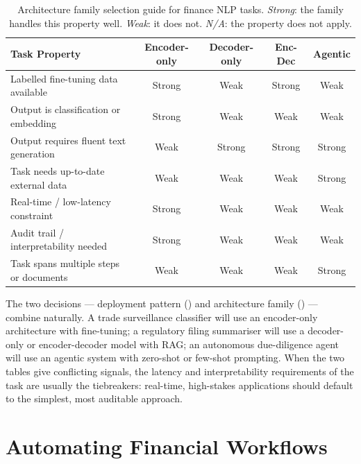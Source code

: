 \begin{table}[htbp]
\caption{Architecture family selection guide for finance NLP tasks. \emph{Strong}: the family handles this property well. \emph{Weak}: it does not. \emph{N/A}: the property does not apply.}
\label{tab:arch-decision}
\centering
\small
\begin{tabularx}{\linewidth}{X cccc}
\toprule
\textbf{Task Property}
  & \textbf{Encoder-only}
  & \textbf{Decoder-only}
  & \textbf{Enc-Dec}
  & \textbf{Agentic} \\
\midrule
Labelled fine-tuning data available    & Strong & Weak   & Strong & Weak   \\
Output is classification or embedding  & Strong & Weak   & Weak   & Weak   \\
Output requires fluent text generation & Weak   & Strong & Strong & Strong \\
Task needs up-to-date external data    & Weak   & Weak   & Weak   & Strong \\
Real-time / low-latency constraint     & Strong & Weak   & Weak   & Weak   \\
Audit trail / interpretability needed  & Strong & Weak   & Weak   & Weak   \\
Task spans multiple steps or documents & Weak   & Weak   & Weak   & Strong \\
\bottomrule
\end{tabularx}
\end{table}

\begin{context}

The two decisions — deployment pattern () and architecture family () — combine naturally. A trade surveillance classifier will use an encoder-only architecture with fine-tuning; a regulatory filing summariser will use a decoder-only or encoder-decoder model with RAG; an autonomous due-diligence agent will use an agentic system with zero-shot or few-shot prompting. When the two tables give conflicting signals, the latency and interpretability requirements of the task are usually the tiebreakers: real-time, high-stakes applications should default to the simplest, most auditable approach.

\end{context}


\section{Automating Financial Workflows}
\label{sec:af-workflows}

